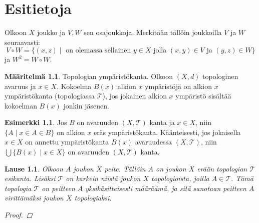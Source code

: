 \documentclass[12pt,a4paper,leqno]{report}
\newcommand{\T}{\mathcal{T}}
\theoremstyle{plain}
\newtheorem{lause}[equation]{Lause}
\theoremstyle{definition}
\newtheorem{maar}[equation]{Määritelmä}
\newtheorem{esim}[equation]{Esimerkki}
\theoremstyle{remark}
\begin{document}
\chapter{Esitietoja}
Olkoon $X$ joukko ja $V,W$ sen osajoukkoja.
Merkitään tällöin joukkoilla $V$ ja $W$ seuraavasti: $$V\circ W=\{(x,z)\mid \text{ on olemassa sellainen }y \in X\text{ jolla }(x,y)\in V\text{ ja }(y,z)\in W\}$$ ja $W^2=W\circ W$.
\begin{maar}%
Topologian ympäristökanta. 
Olkoon $(X,d)$ topologinen avaruus ja $x\in X$. 
Kokoelma $B(x)$ alkion $x$ ympäristöjä on alkion $x$ ympäristökanta (topologiassa $\T$), jos jokainen alkion $x$ ympäristö sisältää kokoelman $B(x)$ jonkin jäsenen. 
\end{maar}
\begin{esim}
Jos $B$ on avaruuden $(X,\T)$ kanta ja $x\in X$, niin $\{A\mid x\in A\in B\}$ on alkion $x$ eräs ympäristökanta.
Käänteisesti, jos jokaisella $x\in X$ on annettu ympäristökanta $B(x)$ avaruudessa $(X,\T)$, niin $\bigcup\{B(x)\mid x\in X\}$ on avaruuden $(X,\T)$ kanta.
\end{esim}
\begin{lause}
Olkoon $A$ joukon $X$ peite. Tällöin $A$ on joukon $X$ erään topologian $\T$ esikanta. Lisäksi $\T$ on karkein niistä joukon $X$ topologioista, joilla $A\in\T$. Tämä topologia $\T$ on peitteen $A$ yksikäsitteisesti määräämä, ja sitä sanotaan peitteen $A$ virittämäksi joukon $X$ topologiaksi.
\begin{proof}
\end{proof}
\end{lause}
\end{document}
